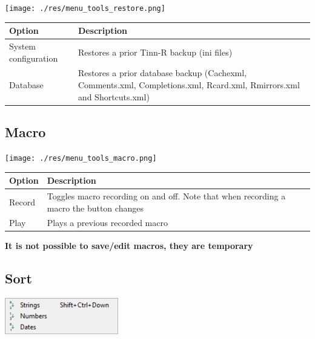\texttt{[image: ./res/menu\_tools\_restore.png]}\\

\begin{scriptsize}
  \begin{tabularx}{\textwidth}{>{\hsize=0.3\hsize}X>{\hsize=0.7\hsize}X}\\
    \hline
    \textbf{Option} & \textbf{Description} \\
    \hline
    System configuration & Restores a prior Tinn-R backup (ini files) \\
    Database & Restores a prior database backup
     (Cachexml, Comments.xml, Completions.xml, Rcard.xml, Rmirrors.xml and Shortcuts.xml) \\
    \hline
  \end{tabularx}
\end{scriptsize}


\hypertarget{menu_tools_macro}{}
\subsection{Macro}

\texttt{[image: ./res/menu\_tools\_macro.png]}\\

\begin{scriptsize}
  \begin{tabularx}{\textwidth}{>{\hsize=0.3\hsize}X>{\hsize=0.7\hsize}X}\\
    \hline
    \textbf{Option} & \textbf{Description} \\
    \hline
    Record & Toggles macro recording on and off. Note that when recording a macro the button changes \\
    Play & Plays a previous recorded macro \\
    \hline
  \end{tabularx}
\end{scriptsize}

\textbf{It is not possible to save/edit macros, they are temporary}


\hypertarget{menu_tools_sort}{}
\subsection{Sort}

\includegraphics[scale=0.8]{./res/menu_tools_sort.png}\\

